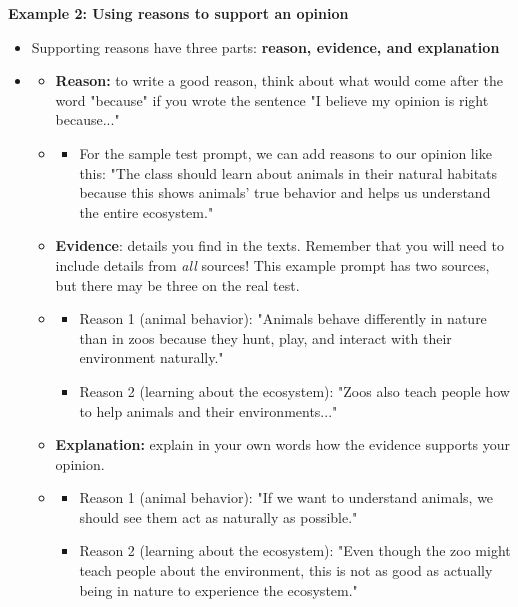 \documentclass[12pt]{article}
\begin{document}
\begin{tcolorbox}[colframe=black!60, colback=white, 
coltitle=black, colbacktitle=black!15, fonttitle=\bfseries\Large, 
title=Examples, halign title=center, left=10pt, right=10pt, top=10pt, bottom=15pt]

\textbf{Example 2: Using reasons to support an opinion}
\begin{itemize}
    \item Supporting reasons have three parts: \textbf{reason, evidence, and explanation}

    \item 
    \begin{itemize}
        \item \textbf{Reason:} to write a good reason, think about what would come after the word "because" if you wrote the sentence "I believe my opinion is right because..."
        \item
        \begin{itemize}
            \item For the sample test prompt, we can add reasons to our opinion like this: "The class should learn about animals in their natural habitats because this shows animals' true behavior and helps us understand the entire ecosystem."
        \end{itemize}
        \item \textbf{Evidence}: details you find in the texts. Remember that you will need to include details from \textit{all} sources! This example prompt has two sources, but there may be three on the real test.
        \item
        \begin{itemize}
            \item Reason 1 (animal behavior): "Animals behave differently in nature than in zoos because they hunt, play, and interact with their environment naturally."
            \item Reason 2 (learning about the ecosystem): "Zoos also teach people how to help animals and their environments..."
        \end{itemize}
        \item \textbf{Explanation:} explain in your own words how the evidence supports your opinion. 
        \item \begin{itemize}
            \item Reason 1 (animal behavior): "If we want to understand animals, we should see them act as naturally as possible."
            \item Reason 2 (learning about the ecosystem): "Even though the zoo might teach people about the environment, this is not as good as actually being in nature to experience the ecosystem."
        \end{itemize}
    \end{itemize}
        \end{itemize}


\end{tcolorbox}
\end{document}
